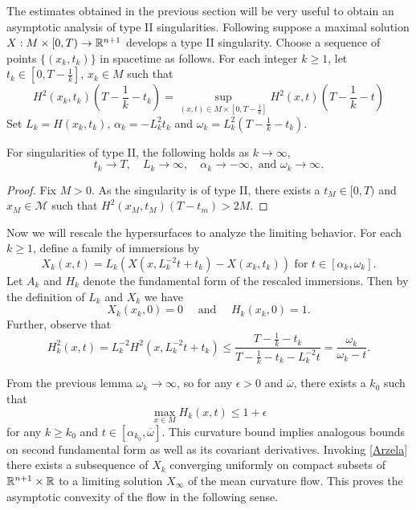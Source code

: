     The estimates obtained in the previous section will be very useful to obtain an asymptotic analysis of type II singularities. Following \cite{huisken1999mean} suppose a maximal solution  $X : M \times [0,T) \to \mathbb{R}^{n+1} $ develops a type II singularity. Choose a sequence of points $ \{(x_{k},t_{k})\} $ in spacetime as follows. For each integer $ k \ge 1 $, let $ t_{k} \in [0,T-\frac{1}{k}] $, $ x_{k} \in M $ such that \begin{equation}
        H^{2}(x_{k},t_{k})\left( T- \frac{1}{k}-t_{k} \right) = \sup_{(x,t) \in M \times\left[0,T-\frac{1}{k}\right]}H^{2}(x,t)\left(  T- \frac{1}{k}- t\right)
    \end{equation}
    Set $ L_{k} = H(x_{k},t_{k}) $, $ \alpha_{k} = -L^{2}_{k}t_{k} $ and $ \omega_{k} = L_{k}^{2}(T-\frac{1}{k}-t_{k}) $. 
    \begin{lemma}
        For singularities of type II, the following holds as $ k \to \infty $, 
        \[ t_{k} \to T, \quad L_{k} \to \infty,\quad  \alpha_{k} \to -\infty,\text{ and } \omega_{k} \to \infty .\]
    \end{lemma}
    \begin{proof}%
        Fix $ M  >0 $. As the singularity is of type II, there exists a $ t_{M} \in [0,T) $ and $ x_{M} \in \mathcal{M} $ such that $ H^{2}(x_{M},t_{M})(T-t_{m})> 2M $. 
    \end{proof}
    Now we will rescale the hypersurfaces to analyze the limiting behavior. For each $ k \ge 1 $, define a family of immersions by 
    \[ X_{k}(x, t) = L_{k}(X(x, L_{k}^{-2}t+t_{k})-X(x_{k},t_{k}))  \text{ for } t \in [\alpha_{k}, \omega_{k}].\]
    Let $ A_{k} $ and $ H_{k} $ denote the fundamental form of the rescaled immersions. Then by the definition of $ L_{k} $ and $ X_{k} $ we have 
    \[ X_{k}(x_{k},0) = 0 \quad \text{ and }\quad H_{k}(x_{k},0)=1.\]
    Further,  observe that 
    \[ H_{k}^{2}(x,t) = L_{k}^{-2}H^{2}(x, L_{k}^{-2}t+t_{k}) \le \frac{T - \frac{1}{k}-t_{k}}{T-\frac{1}{k}-t_{k}-L_{k}^{-2}t} = \frac{\omega_{k}}{\omega_{k}-t}. \]

    From the previous lemma $ \omega_{k} \to \infty $, so for any $ \epsilon >0 $ and $ \overline{\omega} $, there exists a $ k_{0} $ such that 
    \[ \max_{x \in M} H_{k}(x,t) \le 1+\epsilon \]
    for any $ k \ge k_{0} $ and $ t \in [\alpha_{k_{0}}, \overline{\omega}] $. This curvature bound implies analogous bounds on second fundamental form as well as its covariant derivatives. Invoking \cref{Arzela} there exists a subsequence of $ X_{k} $ converging uniformly on compact subsets of $ \mathbb{R}^{n+1} \times \mathbb{R} $ to a limiting solution $ X_{\infty} $ of the mean curvature flow. This proves the asymptotic convexity of the flow in the following sense.
     
